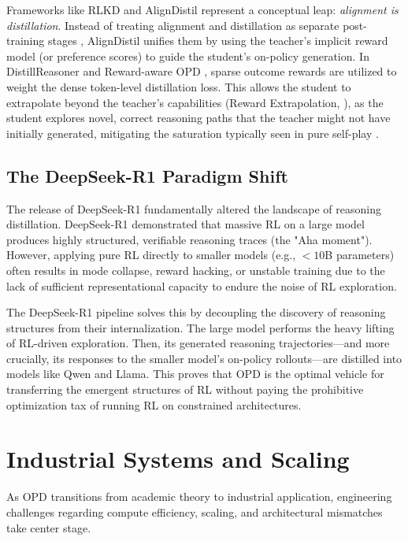 \documentclass{article}
\begin{document}
Frameworks like RLKD \citep{arxiv_2505_16142} and AlignDistil \citep{arxiv_2503_02832} represent a conceptual leap: \textit{alignment is distillation}. Instead of treating alignment and distillation as separate post-training stages \citep{arxiv_2312_01552}, AlignDistil unifies them by using the teacher's implicit reward model (or preference scores) to guide the student's on-policy generation. In DistillReasoner \citep{arxiv_2408_06037} and Reward-aware OPD \citep{arxiv_2503_04711}, sparse outcome rewards are utilized to weight the dense token-level distillation loss. This allows the student to extrapolate beyond the teacher's capabilities (Reward Extrapolation, \citealp{arxiv_2602_12125}), as the student explores novel, correct reasoning paths that the teacher might not have initially generated, mitigating the saturation typically seen in pure self-play \citep{arxiv_2411_04109}.

\subsection{The DeepSeek-R1 Paradigm Shift}
The release of DeepSeek-R1 \citep{arxiv_2501_12948} fundamentally altered the landscape of reasoning distillation. DeepSeek-R1 demonstrated that massive RL on a large model produces highly structured, verifiable reasoning traces (the "Aha moment"). However, applying pure RL directly to smaller models (e.g., $<10$B parameters) often results in mode collapse, reward hacking, or unstable training due to the lack of sufficient representational capacity to endure the noise of RL exploration.

The DeepSeek-R1 pipeline solves this by decoupling the discovery of reasoning structures from their internalization. The large model performs the heavy lifting of RL-driven exploration. Then, its generated reasoning trajectories—and more crucially, its responses to the smaller model's on-policy rollouts—are distilled into models like Qwen and Llama. This proves that OPD is the optimal vehicle for transferring the emergent structures of RL without paying the prohibitive optimization tax of running RL on constrained architectures.

\section{Industrial Systems and Scaling}
\label{sec:systems}

As OPD transitions from academic theory to industrial application, engineering challenges regarding compute efficiency, scaling, and architectural mismatches take center stage. 
\end{document}
